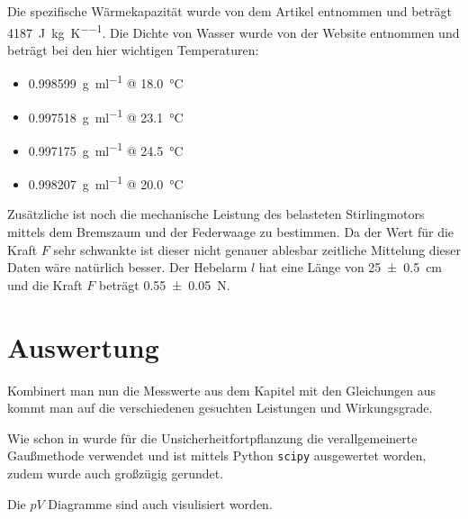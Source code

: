 \documentclass[11pt]{scrartcl}
\begin{document}
Die spezifische Wärmekapazität wurde von dem Artikel \cite{uitspezifische} entnommen
und beträgt \SI{4187}{\joule\per\kilogram\per\kelvin}.
Die Dichte von Wasser wurde von der Website \cite{Wagner2002} entnommen und 
beträgt bei den hier wichtigen Temperaturen:

\begin{itemize}
    \item \SI{0.998599}{\gram\per\ml} @ \SI{18.0}{\celsius} 
    \item \SI{0.997518}{\gram\per\ml} @ \SI{23.1}{\celsius}
    \item \SI{0.997175}{\gram\per\ml} @ \SI{24.5}{\celsius}
    \item \SI{0.998207}{\gram\per\ml} @ \SI{20.0}{\celsius}
\end{itemize}

Zusätzliche ist noch die mechanische Leistung des belasteten Stirlingmotors
mittels dem Bremszaum und der Federwaage zu bestimmen. Da der Wert für
die Kraft $F$ sehr schwankte ist dieser nicht genauer ablesbar zeitliche
Mittelung dieser Daten wäre natürlich besser. Der Hebelarm $l$ hat eine Länge
von \SI{25+-0.5}{\cm} und die Kraft $F$ beträgt \SI{0.55(5)}{\newton}.

\section{Auswertung}
\label{sec:auswertung}

Kombinert man nun die Messwerte aus dem Kapitel  
mit den Gleichungen aus 
kommt man auf die verschiedenen gesuchten Leistungen und Wirkungsgrade.

Wie schon in  wurde für die Unsicherheitfortpflanzung 
die verallgemeinerte Gaußmethode verwendet und ist mittels Python \verb|scipy| ausgewertet
worden, zudem wurde auch großzügig gerundet.

Die $pV$ Diagramme sind auch visulisiert worden.
\end{document}
